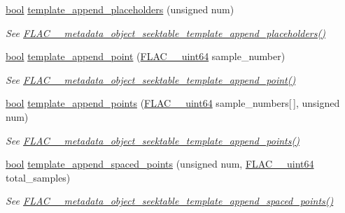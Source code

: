 \begin{DoxyCompactItemize}
\hyperlink{mac_2config_2i386_2lib-src_2libsoxr_2soxr-config_8h_abb452686968e48b67397da5f97445f5b}{bool} \hyperlink{class_f_l_a_c_1_1_metadata_1_1_seek_table_ae5be56e6dd95f27cb708206285bde4d8}{template\+\_\+append\+\_\+placeholders} (unsigned num)
\begin{DoxyCompactList}\small\item\em See \hyperlink{group__flac__metadata__object_gae9d8c43dc78bde9778c4e57c5f74b025}{F\+L\+A\+C\+\_\+\+\_\+metadata\+\_\+object\+\_\+seektable\+\_\+template\+\_\+append\+\_\+placeholders()} \end{DoxyCompactList}\item 
\hyperlink{mac_2config_2i386_2lib-src_2libsoxr_2soxr-config_8h_abb452686968e48b67397da5f97445f5b}{bool} \hyperlink{class_f_l_a_c_1_1_metadata_1_1_seek_table_a9c05d6c010988cf2f336ab1c02c3c618}{template\+\_\+append\+\_\+point} (\hyperlink{ordinals_8h_aa78c8c70a3eb8a58af7436f278acde8e}{F\+L\+A\+C\+\_\+\+\_\+uint64} sample\+\_\+number)
\begin{DoxyCompactList}\small\item\em See \hyperlink{group__flac__metadata__object_ga9ce1940ca29d71739316cf104256c078}{F\+L\+A\+C\+\_\+\+\_\+metadata\+\_\+object\+\_\+seektable\+\_\+template\+\_\+append\+\_\+point()} \end{DoxyCompactList}\item 
\hyperlink{mac_2config_2i386_2lib-src_2libsoxr_2soxr-config_8h_abb452686968e48b67397da5f97445f5b}{bool} \hyperlink{class_f_l_a_c_1_1_metadata_1_1_seek_table_a645edc4788158d141d67dee5d078594a}{template\+\_\+append\+\_\+points} (\hyperlink{ordinals_8h_aa78c8c70a3eb8a58af7436f278acde8e}{F\+L\+A\+C\+\_\+\+\_\+uint64} sample\+\_\+numbers\mbox{[}$\,$\mbox{]}, unsigned num)
\begin{DoxyCompactList}\small\item\em See \hyperlink{group__flac__metadata__object_gac27a59879fa8cdf47b75f8d73de82f0e}{F\+L\+A\+C\+\_\+\+\_\+metadata\+\_\+object\+\_\+seektable\+\_\+template\+\_\+append\+\_\+points()} \end{DoxyCompactList}\item 
\hyperlink{mac_2config_2i386_2lib-src_2libsoxr_2soxr-config_8h_abb452686968e48b67397da5f97445f5b}{bool} \hyperlink{class_f_l_a_c_1_1_metadata_1_1_seek_table_a41393ffc88aaa59772081b2b4a211446}{template\+\_\+append\+\_\+spaced\+\_\+points} (unsigned num, \hyperlink{ordinals_8h_aa78c8c70a3eb8a58af7436f278acde8e}{F\+L\+A\+C\+\_\+\+\_\+uint64} total\+\_\+samples)
\begin{DoxyCompactList}\small\item\em See \hyperlink{group__flac__metadata__object_gab96c6585578c87f6853731860e2872e0}{F\+L\+A\+C\+\_\+\+\_\+metadata\+\_\+object\+\_\+seektable\+\_\+template\+\_\+append\+\_\+spaced\+\_\+points()} \end{DoxyCompactList}\item 

\end{DoxyCompactItemize}
